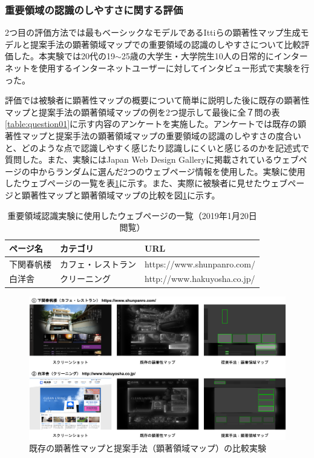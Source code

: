 \subsubsection{重要領域の認識のしやすさに関する評価}
\par 2つ目の評価方法では最もベーシックなモデルであるIttiらの顕著性マップ生成モデル\cite{itti1998model}と提案手法の顕著領域マップでの重要領域の認識のしやすさについて比較評価した。本実験では20代の19$\sim$25歳の大学生・大学院生10人の日常的にインターネットを使用するインターネットユーザーに対してインタビュー形式で実験を行った。

\par 評価では被験者に顕著性マップの概要について簡単に説明した後に既存の顕著性マップと提案手法の顕著領域マップの例を2つ提示して最後に全７問の表\ref{table:question01}に示す内容のアンケートを実施した。アンケートでは既存の顕著性マップと提案手法の顕著領域マップの重要領域の認識のしやすさの度合いと、どのような点で認識しやすく感じたり認識しにくいと感じるのかを記述式で質問した。また、実験にはJapan Web Design Gallery\cite{japanwebgallery}に掲載されているウェブページの中からランダムに選んだ2つのウェブページ情報を使用した。実験に使用したウェブページの一覧を表\ref{table:webpage-list2}に示す。また、実際に被験者に見せたウェブページと顕著性マップと顕著領域マップの比較を図\ref{fig_experience02}に示す。


\begin{table}[h]
  \caption{重要領域認識実験に使用したウェブページの一覧（2019年1月20日閲覧）}
  \label{table:webpage-list2}
  \centering
  \begingroup
  \renewcommand{\arraystretch}{1.2} %
  \small
    \begin{tabular}{lll}
    \hline
    ページ名 & カテゴリ & URL \\
    \hline \hline
    下関春帆楼 & カフェ・レストラン & https://www.shunpanro.com/ \\
    白洋舎 & クリーニング & http://www.hakuyosha.co.jp/ \\
    \hline
  \end{tabular}
  \endgroup
\end{table}

\begin{figure}[H]
  \centering
  \includegraphics[width=12cm]{figures/07_experience02.png}
  \caption{既存の顕著性マップと提案手法（顕著領域マップ）の比較実験}
  \label{fig_experience02}
\end{figure}


